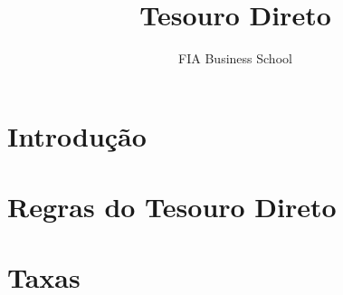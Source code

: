 \documentclass{article}\usepackage[]{graphicx}\usepackage[]{xcolor}
\title{Tesouro Direto}
\author{FIA Business School}
\begin{document}
\maketitle

\section*{Introdução}

\section*{Regras do Tesouro Direto}

\section*{Taxas}
\end{document}

